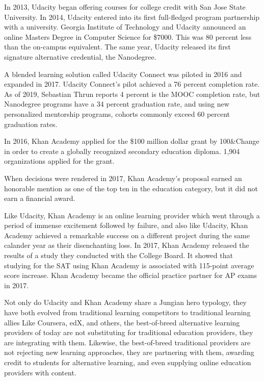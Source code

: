 \documentclass[review]{elsarticle}
\begin{document}
In 2013, Udacity began offering courses for college credit with San Jose State University\cite{shen_2015}.
In 2014, Udacity entered into its first full-fledged program partnership with a university.
Georgia Institute of Technology and Udacity announced an online Masters Degree in Computer Science for \$7000.
This was 80 percent less than the on-campus equivalent\cite{onink2013georgia}.
The same year, Udacity released its first signature alternative credential, the Nanodegree.

A blended learning solution called Udacity Connect was piloted in 2016 and expanded in 2017.
Udacity Connect's pilot achieved a 76 percent completion rate\cite{shah_2018}.
As of 2019, Sebastian Thrun reports 4 percent is the MOOC completion rate,
but Nanodegree programs have a 34 percent graduation rate, and using new personalized mentorship programs, cohorts commonly exceed 60 percent graduation rates.

In 2016, Khan Academy applied for the \$100 million dollar grant
by 100\&Change in order to create a globally recognized secondary education diploma.
1,904 organizations applied for the grant\cite{conrad_2016}.


When decisions were rendered in 2017, Khan Academy's proposal earned an honorable mention as one of the top ten in the education category,
but it did not earn a financial award\cite{cushing_2017}.

Like Udacity, Khan Academy is an online learning provider which went through a period of immense excitement followed by failure,
and also like Udacity, Khan Academy achieved a remarkable success on a different project during the same calander year as their disenchanting loss.
In 2017, Khan Academy released the results of a study they conducted with the College Board.
It showed that studying for the SAT using Khan Academy is associated with 115-point average score increase\cite{khan_academy_sat_2017}.
Khan Academy became the official practice partner for AP exams in 2017\cite{khan_academy_partner_2017}.

Not only do Udacity and Khan Academy share a Jungian hero typology,
they have both evolved from traditional learning competitors to traditional learning allies
Like Coursera, edX, and others, the best-of-breed alternative learning providers of today are not substituting for traditional education providers,
they are integrating with them. Likewise, the best-of-breed traditional providers are not rejecting new learning approaches,
they are partnering with them, awarding credit to students for alternative learning, and even supplying online education providers with content.
\end{document}
